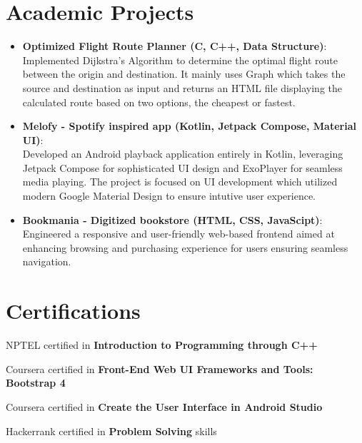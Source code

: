\documentclass[a4paper,20pt]{article}
\newcommand{\resumeItem}[2]{
  \item\small{
    \textbf{#1}{: #2 \vspace{-2pt}}
  }
}
\newcommand{\resumeSubItem}[2]{\resumeItem{#1}{#2}\vspace{-3pt}}
\newcommand{\resumeSubHeadingListStart}{\begin{itemize}[leftmargin=*]}
\newcommand{\resumeSubHeadingListEnd}{\end{itemize}}
\begin{document}
\section{Academic Projects}
\resumeSubHeadingListStart
\resumeSubItem{Optimized Flight Route Planner (C, C++, Data Structure)}\\
\vspace{5pt}
{Implemented Dijkstra's Algorithm to determine the optimal flight route between the origin and destination. It mainly uses Graph which takes the source and destination as input and returns an HTML file displaying the calculated route based on two options, the cheapest or fastest.}
\vspace{5pt}
\resumeSubItem{Melofy - Spotify inspired app (Kotlin, Jetpack Compose, Material UI)}\\
\vspace{5pt}
{Developed an Android playback application entirely in Kotlin, leveraging Jetpack Compose for sophisticated UI design and ExoPlayer for seamless media playing. The project is focused on UI development which utilized modern Google Material Design to ensure intutive user experience.}
\vspace{5pt}
\resumeSubItem{Bookmania - Digitized bookstore (HTML, CSS, JavaScipt)}\\
\vspace{5pt}
{Engineered a responsive and user-friendly web-based frontend aimed at enhancing browsing and purchasing experience for users ensuring seamless navigation.}
\vspace{5pt}
\resumeSubHeadingListEnd
\vspace{2pt}


\section{Certifications}
\begin{description}[font=$\bullet$]
\item {NPTEL certified in \textbf{Introduction to Programming through C++}}
\vspace{-5pt}
\item {Coursera certified in \textbf{Front-End Web UI Frameworks and Tools: Bootstrap 4}}
\vspace{-5pt}
\item {Coursera certified in \textbf{Create the User Interface in Android Studio}}
\vspace{-5pt}
\item {Hackerrank certified in \textbf{Problem Solving} skills}
\vspace{-5pt}
\end{description}
\vspace{2pt}
\end{document}
